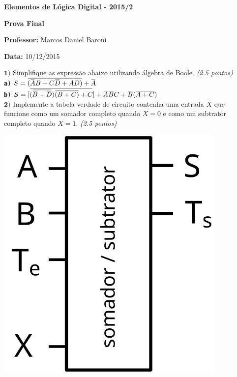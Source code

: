\documentclass[12pt]{article}
\newcommand{\exerc}[3]{ \vspace*{25pt} {$\mathbf{#1)}$} #2 \hfill {\it #3} }
\newcommand{\exitem}[2]{ \texttt{\bf #1)} #2 \\ }
\renewcommand{\neg}[1]{ 
  \mkern 1.5mu\overline{\mkern-1.5mu#1\mkern-1.5mu}\mkern 1.5mu
}
\begin{document}

\begin{center}
{\Large \bf Elementos de Lógica Digital - 2015/2}
\end{center}

{\large \bf Prova Final}

{\bf Professor:} Marcos Daniel Baroni

{\bf Data:} 10/12/2015

\exerc{1}{Simplifique as expressão abaixo utilizando álgebra de Boole.}{(2.5 pontos)}
\\ \hspace*{3em} \exitem{a}{
     $S = \neg{(\neg{A}B + C\neg{D} + AD)}+\neg{A}$
   }
   \hspace*{3em} \exitem{b}{
      $S = [\neg{ (\neg{\neg{B} + \neg{D}})\neg{(B + C)}+ C}] + \neg{A}\neg{B}C + \neg{B}(\neg{A+C})$
   }

\exerc{2}{Implemente a tabela verdade de circuito contenha uma entrada $X$ que
  funcione como um somador completo quando $X=0$ e como um subtrator completo quando $X=1$.}{(2.5 pontos)}
\begin{center}
  \includegraphics[scale=0.5]{circ}
\end{center}
\end{document}
